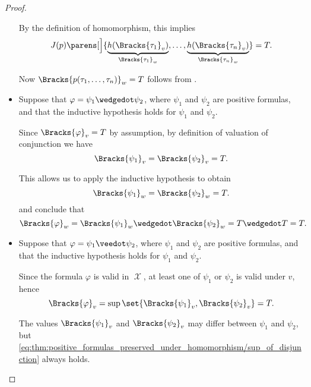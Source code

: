 \begin{proof}
\begin{itemize}
    By the definition of homomorphism, this implies
    \begin{equation}\label{eq:thm:positive_formulas_preserved_under_homomorphism/predicates/y}
      J(p) \parens[\Big]{ \underbrace{h(\Bracks{\tau_1}_v)}_{\Bracks{\tau_1}_w}, \ldots, \underbrace{h(\Bracks{\tau_n}_v)}_{\Bracks{\tau_n}_w} } = T.
    \end{equation}

    Now \( \Bracks{p(\tau_1, \ldots, \tau_n)}_w = T \) follows from .

    \item Suppose that \( \varphi = \psi_1 \synwedge \psi_2 \), where \( \psi_1 \) and \( \psi_2 \) are positive formulas, and that the inductive hypothesis holds for \( \psi_1 \) and \( \psi_2 \).

    Since \( \Bracks{\varphi}_v = T \) by assumption, by definition of valuation of conjunction we have
    \begin{equation*}
      \Bracks{\psi_1}_v
      =
      \Bracks{\psi_2}_v
      =
      T.
    \end{equation*}

    This allows us to apply the inductive hypothesis to obtain
    \begin{equation*}
      \Bracks{\psi_1}_w
      =
      \Bracks{\psi_2}_w
      =
      T.
    \end{equation*}
    and conclude that
    \begin{equation*}
      \Bracks{\varphi}_w
      =
      \Bracks{\psi_1}_w \synwedge \Bracks{\psi_2}_w
      =
      T \synwedge T
      =
      T.
    \end{equation*}

    \item Suppose that \( \varphi = \psi_1 \synvee \psi_2 \), where \( \psi_1 \) and \( \psi_2 \) are positive formulas, and that the inductive hypothesis holds for \( \psi_1 \) and \( \psi_2 \).

    Since the formula \( \varphi \) is valid in \( \mscrX \), at least one of \( \psi_1 \) or \( \psi_2 \) is valid under \( v \), hence
    \begin{equation}\label{eq:thm:positive_formulas_preserved_under_homomorphism/sup_of_disjunction}
      \Bracks{\varphi}_v = \sup\set{ \Bracks{\psi_1}_v, \Bracks{\psi_2}_v } = T.
    \end{equation}

    The values \( \Bracks{\psi_1}_v \) and \( \Bracks{\psi_2}_v \) may differ between \( \psi_1 \) and \( \psi_2 \), but \eqref{eq:thm:positive_formulas_preserved_under_homomorphism/sup_of_disjunction} always holds.


\end{itemize}
\end{proof}

